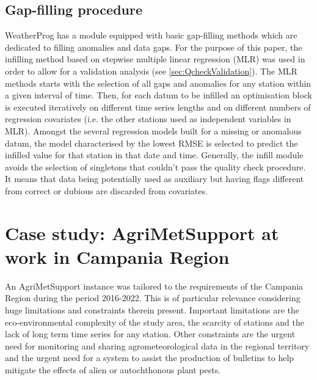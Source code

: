 \documentclass[authoryear,preprint,review,12pt]{elsarticle}
\newcommand{\review}[1]{\emph{\textcolor{cyan}{#1}}}
\begin{document}
\subsection{Gap-filling procedure} \label{sec:infill}

WeatherProg has a module equipped with basic gap-filling methods which are dedicated to filling anomalies and data gaps.
For the purpose of this paper, the infilling method based on stepwise multiple linear regression (MLR) was used in order to allow for a validation analysis (see \cref{sec:QcheckValidation}).
The MLR methods starts with the selection of all gaps and anomalies for any station within a given  interval of time.
Then, for each datum to be infilled an optimisation block is executed iteratively on different time series lengths and on different numbers of regression covariates (i.e. the other stations used as independent variables in MLR).
Amongst the several regression models built for a missing or anomalous datum, the model characterised by the lowest RMSE is selected to predict the infilled value for that station in that date and time.
Generally, the infill module avoids the selection of singletons that couldn't pass the quality check procedure. 
It means that data being potentially used as auxiliary but having flags different from correct or dubious are discarded from covariates.

\section{Case study: AgriMetSupport at work in Campania Region} \label{sec:casestudy}

An AgriMetSupport instance was tailored to the requirements of the Campania Region during the period 2016-2022.
This is of particular relevance considering huge limitations and constraints therein present.
Important limitations are the eco-environmental complexity of the study area, the scarcity of stations and the lack of long term time series for any station.
Other constraints are the urgent need for monitoring and sharing agrometeorological data in the regional territory %
and the urgent need for a system to assist the production of bulletins to help mitigate the effects of alien or autochthonous plant pests.
 
\end{document}
